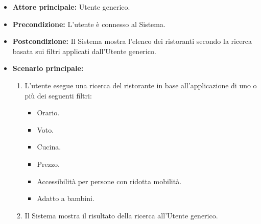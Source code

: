 \label{usecase:Ricerca ristoranti per filtri}
\begin{itemize}
	\item \textbf{Attore principale:} Utente generico.

	\item \textbf{Precondizione:} L'utente è connesso al Sistema.

	\item \textbf{Postcondizione:} Il Sistema mostra l'elenco dei ristoranti secondo la ricerca basata sui filtri applicati dall'Utente generico.

	\item \textbf{Scenario principale:}
	      \begin{enumerate}
		      \item L'utente esegue una ricerca del ristorante in base all'applicazione di uno o più dei seguenti filtri:
		            \begin{itemize}
			            \item Orario.
			            \item Voto.
			            \item Cucina.
			            \item Prezzo.
			            \item Accessibilità per persone con ridotta mobilità.
			            \item Adatto a bambini.
		            \end{itemize}
		      \item Il Sistema mostra il risultato della ricerca all'Utente generico.
	      \end{enumerate}
\end{itemize}
